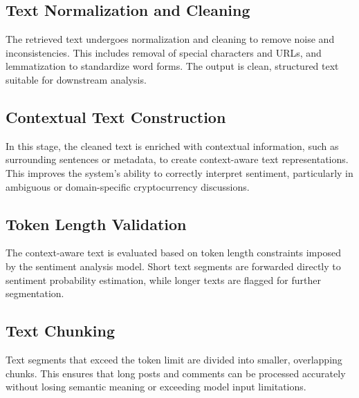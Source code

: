 \subsection{Text Normalization and Cleaning}

The retrieved text undergoes normalization and cleaning to remove noise and inconsistencies. This includes removal of special characters and URLs, and lemmatization to standardize word forms. The output is clean, structured text suitable for downstream analysis.

\subsection{Contextual Text Construction}

In this stage, the cleaned text is enriched with contextual information, such as surrounding sentences or metadata, to create context-aware text representations. This improves the system's ability to correctly interpret sentiment, particularly in ambiguous or domain-specific cryptocurrency discussions.

\subsection{Token Length Validation}

The context-aware text is evaluated based on token length constraints imposed by the sentiment analysis model. Short text segments are forwarded directly to sentiment probability estimation, while longer texts are flagged for further segmentation.

\subsection{Text Chunking}

Text segments that exceed the token limit are divided into smaller, overlapping chunks. This ensures that long posts and comments can be processed accurately without losing semantic meaning or exceeding model input limitations.

